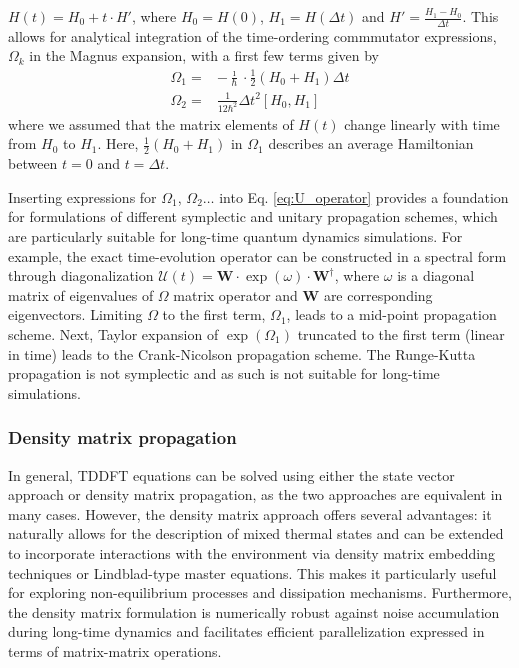 \documentclass[journal=jctcce,manuscript=article,etalmode=truncate,maxauthors=10,layout=twocolumn,9pt]{achemso}   %
\begin{document}
$H(t) = H_0 + t \cdot H'$,  where  $H_0=H(0)$,  $H_1= H(\Delta t)$  and  $H' = \frac{H_1 -H_0}{\Delta t}$.
This allows for analytical  integration of the time-ordering commmutator expressions,
 $\Omega_k$ in the  Magnus expansion, with  
a first few  terms given by 
\begin{align} 
\label{eq:omega1a} \Omega_1 = & -\frac{\imath}{\hbar} \cdot \tfrac{1} {2} (H_0 +H_1) \Delta t   \\
\Omega_2 = & \frac{1}{12 \hbar^2} \Delta t^2 [H_0, H_1 ]  %
\end{align}
where we assumed  that the matrix elements of  $H(t)$ change linearly with time from $H_0$ to $H_1$.
Here, $\tfrac{1} {2} (H_0 +H_1)$ in  $\Omega_1$ describes an average Hamiltonian between $t=0$ and $t=\Delta t$.

Inserting  expressions for $\Omega_1$, $\Omega_2\ldots$ into Eq. \ref{eq:U_operator}
provides  a  foundation  for formulations  of different symplectic and unitary propagation schemes,
 which are  particularly suitable for long-time quantum dynamics simulations.
For example, the exact  time-evolution operator  can be constructed in a spectral form through diagonalization
${\mathcal U}(t) = {\mathbf W} \cdot \exp(\omega)\cdot {\mathbf W}^\dag$, where $\omega$ is a diagonal matrix 
of eigenvalues of $\Omega$ matrix operator and $ {\mathbf W}$ are corresponding eigenvectors.
 Limiting $\Omega$ to the first term, $\Omega_1$, leads to a  mid-point propagation scheme. 
Next, Taylor expansion of $\exp(\Omega_1)$ truncated to the first term  (linear in time) leads to the Crank-Nicolson
propagation scheme. The Runge-Kutta propagation is not symplectic and as such is not suitable for long-time 
 simulations.


\subsubsection{Density matrix propagation  }

 In general, TDDFT equations can be solved using either the state vector approach or density matrix propagation, as the two approaches are equivalent in many cases. However, the density matrix approach offers several advantages: it naturally allows for the description of mixed thermal states and can be extended to incorporate interactions with the environment via density matrix embedding techniques or Lindblad-type master equations. This makes it particularly useful for exploring non-equilibrium processes and dissipation mechanisms. Furthermore, the density matrix formulation is numerically robust against noise accumulation during long-time dynamics and facilitates efficient parallelization expressed in terms of matrix-matrix operations.
 
\end{document}
